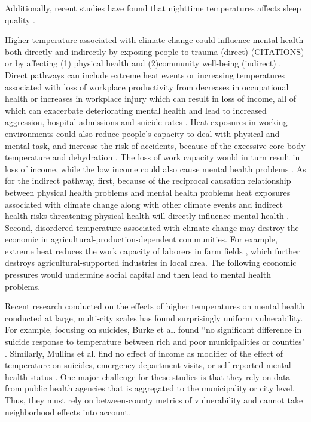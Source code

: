 \documentclass[fleqn,10pt]{wlscirep}
\begin{document}
Additionally, recent studies have found that nighttime temperatures affects sleep quality \cite{Obradovich2017May, Mullins2019Dec}.

Higher temperature associated with climate change could influence mental health both directly and indirectly by exposing people to trauma (direct) (CITATIONS) or by affecting (1) physical health and (2)community well-being (indirect) \cite{BerryETAL2010}. Direct pathways can include extreme heat events or increasing temperatures associated with loss of workplace productivity from decreases in occupational health or increases in workplace injury \cite{kjellstrom_heat_2016, KjellstromETAL2009, kjellstrom_impact_2016} which can result in loss of income, all of which can exacerbate deteriorating mental health and lead to increased aggression, hospital admissions and suicide rates \cite{BerryETAL2010,CheatwoodDerral1995,CohnETAL2004,BouchamaETAL2007}. Heat exposures in working environments could also reduce people's capacity to deal with physical and mental task, and increase the risk of accidents, because of the excessive core body temperature and dehydration \cite{KjellstromETAL2009}. The loss of work capacity would in turn result in loss of income, while the low income could also cause mental health problems \cite{Katz1997}.  As for the indirect pathway, first, because of the reciprocal causation relationship between physical health problems and mental health problems \cite{MillerETAL2009,PrinceETAL2007} heat exposures associated with climate change along with other climate events and indirect health risks threatening physical health will directly influence mental health \cite{Berry2007,WHO2007}. Second, disordered temperature associated with climate change may destroy the economic in agricultural-production-dependent communities. For example, extreme heat reduces the work capacity of laborers in farm fields \cite{KjellstromETAL2009}, which further destroys agricultural-supported industries in local area\cite{BerryETAL2008}. The following economic pressures would undermine social capital and then lead to mental health problems.

Recent research conducted on the effects of higher temperatures on mental health conducted at large, multi-city scales has found surprisingly uniform vulnerability.  For example, focusing on suicides, Burke et al. found ``no significant difference in suicide response to temperature between rich and poor municipalities or counties" \cite{Burke2018Aug}.  Similarly, Mullins et al. find no effect of income as modifier of the effect of temperature on suicides, emergency department visits, or self-reported mental health status \cite{Mullins2019Dec}.  One major challenge for these studies is that they rely on data from public health agencies that is aggregated to the municipality or city level.  Thus, they must rely on between-county metrics of vulnerability and cannot take neighborhood effects into account.
\end{document}
